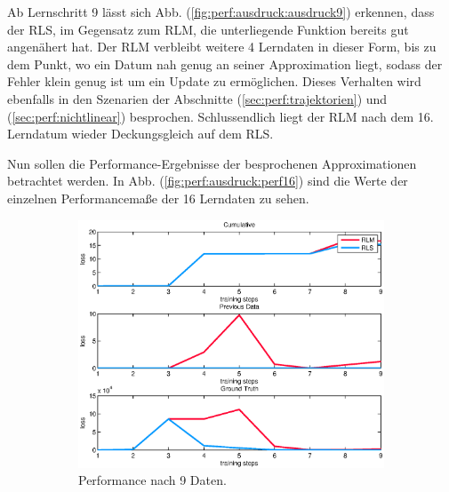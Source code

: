 \documentclass[a4paper, 12pt]{article}
\begin{document}
{Ab Lernschritt 9 lässt sich Abb. (\ref{fig:perf:ausdruck:ausdruck9}) erkennen, dass der RLS, im Gegensatz zum RLM, die unterliegende Funktion bereits gut angenähert hat. Der RLM verbleibt weitere 4 Lerndaten in dieser Form, bis zu dem Punkt, wo ein Datum nah genug an seiner Approximation liegt, sodass der Fehler klein genug ist um ein Update zu ermöglichen. 
Dieses Verhalten wird ebenfalls in den Szenarien der Abschnitte (\ref{sec:perf:trajektorien}) und (\ref{sec:perf:nichtlinear}) besprochen. Schlussendlich liegt der RLM nach dem 16. Lerndatum wieder Deckungsgleich auf dem RLS.

Nun sollen die Performance-Ergebnisse der besprochenen Approximationen betrachtet werden. In Abb. (\ref{fig:perf:ausdruck:perf16}) sind die Werte der einzelnen Performancemaße der 16 Lerndaten zu sehen.
\begin{figure}[H]
        \centering
        \begin{subfigure}[b]{0.4\textwidth}
                \centering
                \includegraphics[width=\textwidth]{./images/copyofstats/ausdruck6_perf_piece_9.eps}
                \caption{Performance nach 9 Daten.}
                \label{fig:perf:ausdruck:perf9}
        \end{subfigure}
        \begin{subfigure}[b]{0.4\textwidth}
                \centering

\end{subfigure}
\end{figure}}
\end{document}
